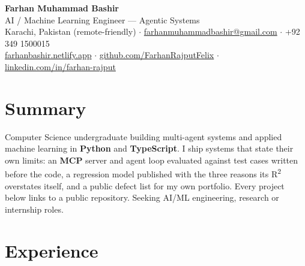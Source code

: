 \documentclass[a4paper,10pt]{article}
\begin{document}
\begin{center}
  {\LARGE\bfseries Farhan Muhammad Bashir}\\[0.35em]
  {\large AI / Machine Learning Engineer --- Agentic Systems}\\[0.45em]
  \small
  Karachi, Pakistan (remote-friendly) \;$\cdot$\;
  \href{mailto:farhanmuhammadbashir@gmail.com}{farhanmuhammadbashir@gmail.com}
  \;$\cdot$\; +92 349 1500015
  \\[0.2em]
  \href{https://farhanbashir.netlify.app}{farhanbashir.netlify.app} \;$\cdot$\;
  \href{https://github.com/FarhanRajputFelix}{github.com/FarhanRajputFelix} \;$\cdot$\;
  \href{https://www.linkedin.com/in/farhan-rajput/}{linkedin.com/in/farhan-rajput}
\end{center}

\vspace{0.3em}

\section{Summary}
Computer Science undergraduate building multi-agent systems and applied machine learning in
\textbf{Python} and \textbf{TypeScript}. I ship systems that state their own limits: an
\textbf{MCP} server and agent loop evaluated against test cases written before the code, a
regression model published with the three reasons its R\textsuperscript{2} overstates itself, and a
public defect list for my own portfolio. Every project below links to a public repository.
Seeking AI/ML engineering, research or internship roles.

\section{Experience}
\end{document}
